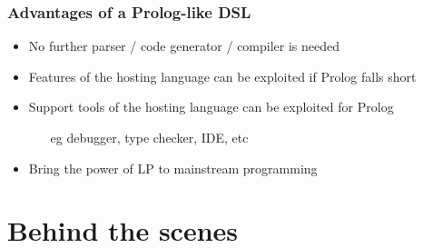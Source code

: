 \documentclass[presentation]{beamer}
\begin{document}
\begin{frame}%
    \frametitle{Advantages of a Prolog-like DSL}

    \begin{itemize}

        \item No further parser / code generator / compiler is needed

        \vfill

        \item Features of the hosting language can be exploited if Prolog falls short

        \vfill

        \item Support tools of the hosting language can be exploited for Prolog
        \begin{itemize}
            \item[eg] debugger, type checker, IDE, etc
        \end{itemize}

        \vfill

        \item Bring the power of LP to mainstream programming
    \end{itemize}

\end{frame}

\section{Behind the scenes}
\end{document}
